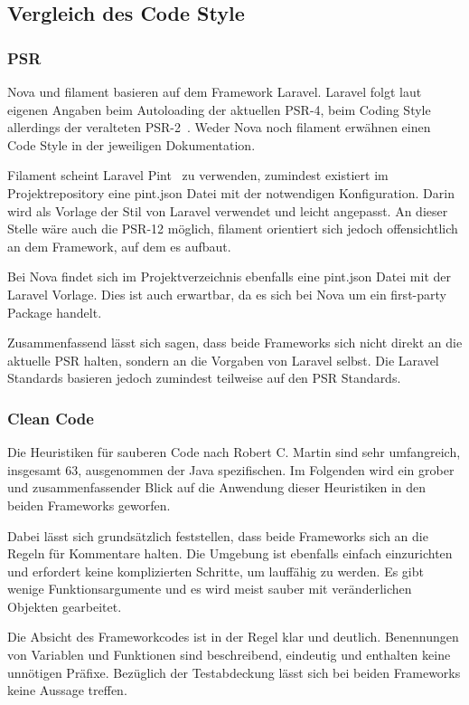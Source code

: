 \subsection{Vergleich des Code Style}

\subsubsection{PSR}
Nova und filament basieren auf dem Framework Laravel.
Laravel folgt laut eigenen Angaben beim Autoloading der aktuellen PSR-4, beim Coding Style allerdings der veralteten PSR-2~\cite{laravel-docs-coding-style}.
Weder Nova noch filament erwähnen einen Code Style in der jeweiligen Dokumentation.

Filament scheint Laravel Pint~\cite{laravel-docs-pint} zu verwenden, zumindest existiert im Projektrepository eine pint.json Datei mit der notwendigen Konfiguration.
Darin wird als Vorlage der Stil von Laravel verwendet und leicht angepasst.
An dieser Stelle wäre auch die PSR-12 möglich, filament orientiert sich jedoch offensichtlich an dem Framework, auf dem es aufbaut.

Bei Nova findet sich im Projektverzeichnis ebenfalls eine pint.json Datei mit der Laravel Vorlage.
Dies ist auch erwartbar, da es sich bei Nova um ein first-party Package handelt.

Zusammenfassend lässt sich sagen, dass beide Frameworks sich nicht direkt an die aktuelle PSR halten, sondern an die Vorgaben von Laravel selbst.
Die Laravel Standards basieren jedoch zumindest teilweise auf den PSR Standards.

\subsubsection{Clean Code}
Die Heuristiken für sauberen Code nach Robert C. Martin sind sehr umfangreich, insgesamt 63, ausgenommen der Java spezifischen.
Im Folgenden wird ein grober und zusammenfassender Blick auf die Anwendung dieser Heuristiken in den beiden Frameworks geworfen.

Dabei lässt sich grundsätzlich feststellen, dass beide Frameworks sich an die Regeln für Kommentare halten.
Die Umgebung ist ebenfalls einfach einzurichten und erfordert keine komplizierten Schritte, um lauffähig zu werden.
Es gibt wenige Funktionsargumente und es wird meist sauber mit veränderlichen Objekten gearbeitet.

Die Absicht des Frameworkcodes ist in der Regel klar und deutlich.
Benennungen von Variablen und Funktionen sind beschreibend, eindeutig und enthalten keine unnötigen Präfixe.
Bezüglich der Testabdeckung lässt sich bei beiden Frameworks keine Aussage treffen.

